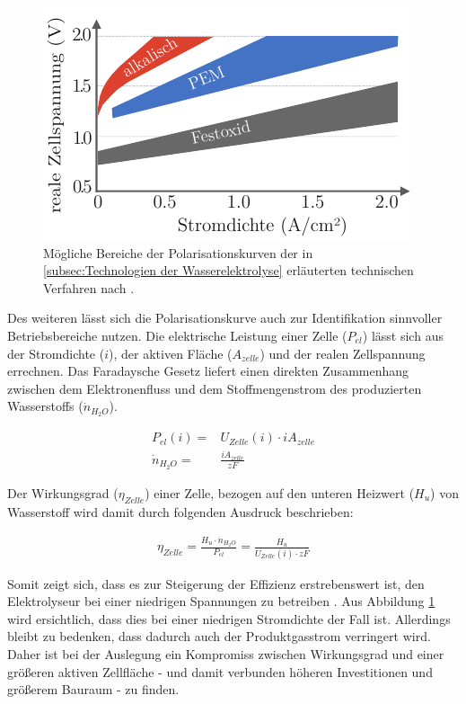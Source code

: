 \begin{figure}[h]
	\centering
		\includegraphics[scale=1]{Figures/PolarisationskurvenElektrolyseure}
		\caption{Mögliche Bereiche der Polarisationskurven der in \ref{subsec:Technologien der Wasserelektrolyse} erläuterten technischen Verfahren nach \citet{tremel_electrolysisfundamental_2018}.}
\label{fig:PolarisationskurveElektrolyseure}	\end{figure}

Des weiteren lässt sich die Polarisationskurve auch zur Identifikation sinnvoller Betriebsbereiche nutzen.
Die elektrische Leistung einer Zelle ($P_{el}$) lässt sich aus der Stromdichte ($i$), der aktiven Fläche ($A_{zelle}$) und der realen Zellspannung errechnen. Das Faradaysche Gesetz liefert einen direkten Zusammenhang zwischen dem Elektronenfluss und dem Stoffmengenstrom des produzierten Wasserstoffs ($\dot{n}_{H_2O}$).

\begin{align}
	P_{el}(i) = &U_{Zelle}(i)\cdot i A_{zelle}\\
	\dot{n}_{H_2O} = &\frac{i A_{zelle}}{zF}
	\label{gl:n_i}
\end{align}

Der Wirkungsgrad ($\eta _{Zelle}$) einer Zelle, bezogen auf den unteren Heizwert ($H_u$) von Wasserstoff wird damit durch folgenden Ausdruck beschrieben:

\begin{align}
	\eta _{Zelle} = \frac{H_u \cdot\dot{n}_{H_2O}}{P_{el}} = \frac{H_u}{U_{Zelle}(i)\cdot{zF}}
\end{align}

Somit zeigt sich, dass es zur Steigerung der Effizienz erstrebenswert ist, den Elektrolyseur bei einer niedrigen Spannungen zu betreiben \citep{biaku_semiempirical_2008}. Aus Abbildung \ref{fig:PolarisationskurveElektrolyseure} wird ersichtlich, dass dies bei einer niedrigen Stromdichte der Fall ist. Allerdings bleibt zu bedenken, dass dadurch auch der Produktgasstrom verringert wird. Daher ist bei der Auslegung ein Kompromiss zwischen Wirkungsgrad und einer größeren aktiven Zellfläche - und damit verbunden höheren Investitionen und größerem Bauraum - zu finden.\\

